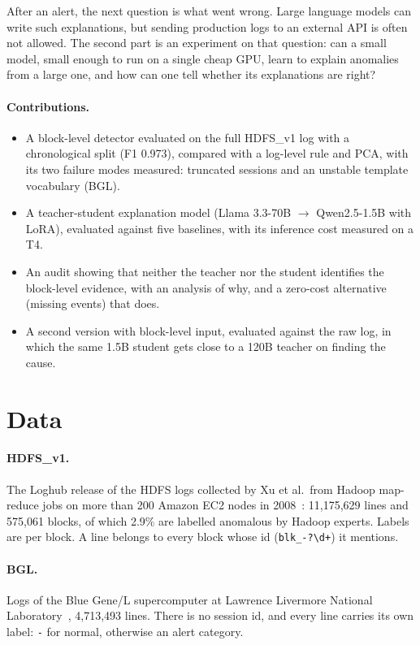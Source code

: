\documentclass[11pt,a4paper]{article}
\newcommand{\code}[1]{\texttt{#1}}
\begin{document}
After an alert, the next question is what went wrong. Large language models can write such
explanations, but sending production logs to an external API is often not allowed. The second
part is an experiment on that question: can a small model, small enough to run on a single
cheap GPU, learn to explain anomalies from a large one, and how can one tell whether its
explanations are right?

\paragraph{Contributions.}
\begin{itemize}
  \item A block-level detector evaluated on the full HDFS\_v1 log with a chronological split
        (F1 0.973), compared with a log-level rule and PCA, with its two failure modes measured:
        truncated sessions and an unstable template vocabulary (BGL).
  \item A teacher-student explanation model (Llama 3.3-70B $\rightarrow$ Qwen2.5-1.5B with LoRA),
        evaluated against five baselines, with its inference cost measured on a T4.
  \item An audit showing that neither the teacher nor the student identifies the block-level
        evidence, with an analysis of why, and a zero-cost alternative (missing events) that does.
  \item A second version with block-level input, evaluated against the raw log, in which the
        same 1.5B student gets close to a 120B teacher on finding the cause.
\end{itemize}

\section{Data}

\paragraph{HDFS\_v1.} The Loghub release of the HDFS logs collected by Xu et al.\ from Hadoop
map-reduce jobs on more than 200 Amazon EC2 nodes in 2008~\cite{xu2009,zhu2023}: 11,175,629 lines and 575,061 blocks, of which
2.9\% are labelled anomalous by Hadoop experts. Labels are per block. A line belongs to every
block whose id (\code{blk\_-?\textbackslash d+}) it mentions.

\paragraph{BGL.} Logs of the Blue Gene/L supercomputer at Lawrence Livermore National
Laboratory~\cite{oliner2007}, 4,713,493 lines. There is no session id, and every line carries
its own label: \code{-} for normal, otherwise an alert category.
\end{document}
